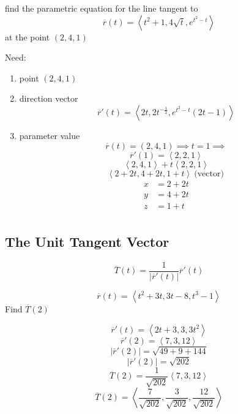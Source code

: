 \begin{example}
	find the parametric equation for the line tangent to \[\overline{r}(t) = \left< t^2+1, 4\sqrt{t}, e^{t^2-t} \right>\]
	at the point $(2,4,1)$
\end{example}

\begin{solution}
	Need:
	\begin{enumerate}
		\item point $(2,4,1)$
			\item direction vector
	\[\overline{r}'(t) = \left<2t, 2t^{-\frac{1}{2}}, e^{t^2-t}(2t-1) \right>\]
	\item parameter value
		\[\overline{r}(t) = (2,4,1) \implies t = 1 \implies\]
		\[\overline{r}'(1) = \left<2,2,1 \right>\]
		\[\boxed{\left<2, 4, 1 \right> + t \left<2, 2, 1 \right>}\]
		\[\boxed{\left<2 + 2t, 4 + 2t, 1 + t \right>}\:\text{(vector)}\:\]
		\begin{align*}
			 x &= 2+ 2t \\
			y &=  4 + 2t \\
			z &= 1 + t \\
		\end{align*}
	\end{enumerate}
\end{solution}

\subsection{The Unit Tangent Vector}%
\label{sub:the_unit_tangent_vector}

\begin{definition}
	\[\overline{T}(t) = \frac{1}{\left| \overline{r}'(t) \right| }\overline{r}'(t)\]
\end{definition}

\begin{example}
	\[\overline{r}(t) = \left<t^2 + 3t, 3t - 8, t^3 -1 \right>\]
	Find $\overline{T}(2)$
\end{example}

\begin{solution}
	\[\overline{r}'(t) = \left<2t+3, 3, 3t^2 \right>\]
	\[\overline{r}'(2) = \left<7, 3, 12 \right>\]
\[\left|  \overline{r}'(2) \right| = \sqrt{ 49 + 9 + 144} \]
\[\left|  \overline{r}'(2) \right| = \sqrt{202} \]
\[\overline{T}(2) =  \frac{1}{\sqrt{202} }\left<7,3,12 \right>\]
\[\overline{T}(2) = \boxed{\left< \frac{7}{\sqrt{202} }, \frac{3}{\sqrt{202} }, \frac{12}{\sqrt{202} } \right>}\]
\end{solution}

